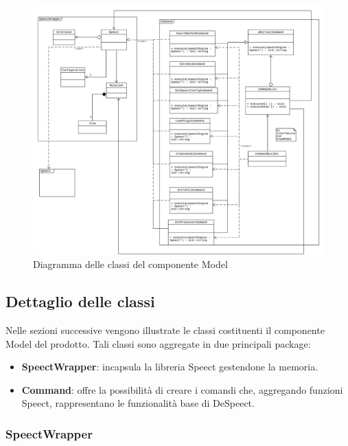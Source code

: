 \documentclass[openany,12pt,a4paper]{report}
\begin{document}
\begin{figure}[H]
	\hspace*{-20mm}
	\includegraphics[scale=0.5]{ModelDiagram}
	\centering
	\caption{Diagramma delle classi del componente Model}
\end{figure}

\subsection{Dettaglio delle classi}

Nelle sezioni successive vengono illustrate le classi costituenti il componente Model del prodotto. Tali classi sono aggregate in due principali package:
\begin{itemize}
	\item \textbf{SpeectWrapper}: incapsula la libreria Speect gestendone la memoria. 
	\item \textbf{Command}: offre la possibilità di creare i comandi che, aggregando funzioni Speect, rappresentano le funzionalità base di DeSpeect.
\end{itemize}

\subsubsection{SpeectWrapper}
\end{document}

